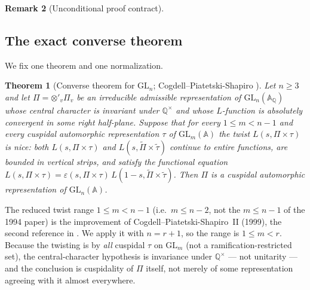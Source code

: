 \documentclass[11pt]{article}
\newtheorem{theorem}{Theorem}
\theoremstyle{definition}
\newtheorem{remark}[theorem]{Remark}
\begin{document}
\begin{remark}[Unconditional proof contract]
\begin{enumerate}
\section{The exact converse theorem}\label{sec:cps-thm}
We fix one theorem and one normalization.
\begin{theorem}[Converse theorem for $\mathrm{GL}_n$; Cogdell--Piatetski-Shapiro \cite{CPS}]\label{thm:cps}
Let $n\ge3$ and let $\Pi=\otimes'_v\Pi_v$ be an \emph{irreducible admissible} representation of
$\mathrm{GL}_n(\mathbb A_{\mathbb Q})$ whose central character is invariant under $\mathbb Q^\times$ and whose
$L$-function is absolutely convergent in some right half-plane. Suppose that for every $1\le m<n-1$ and every
cuspidal automorphic representation $\tau$ of $\mathrm{GL}_m(\mathbb A)$ the twist $L(s,\Pi\times\tau)$ is
\emph{nice}: both $L(s,\Pi\times\tau)$ and $L(s,\widetilde\Pi\times\widetilde\tau)$ continue to entire
functions, are bounded in vertical strips, and satisfy the functional equation
$L(s,\Pi\times\tau)=\varepsilon(s,\Pi\times\tau)\,L(1-s,\widetilde\Pi\times\widetilde\tau)$. Then $\Pi$ is a
\emph{cuspidal automorphic} representation of $\mathrm{GL}_n(\mathbb A)$.
\end{theorem}
\noindent The reduced twist range $1\le m<n-1$ (i.e.\ $m\le n-2$, not the $m\le n-1$ of the 1994 paper) is the
improvement of Cogdell--Piatetski-Shapiro~II (1999), the second reference in \cite{CPS}. We apply it with
$n=r+1$, so the range is $1\le m<r$. Because the twisting is by \emph{all} cuspidal $\tau$ on $\mathrm{GL}_m$
(not a ramification-restricted set), the central-character hypothesis is invariance under $\mathbb Q^\times$ ---
not unitarity --- and the conclusion is cuspidality of $\Pi$ itself, not merely of some representation agreeing
with it almost everywhere.


\end{enumerate}
\end{remark}
\end{document}
